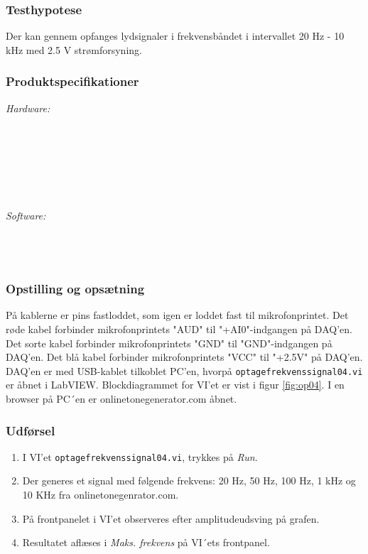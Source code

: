 		\subsubsection{Testhypotese}
		Der kan gennem \elektretto{} opfanges lydsignaler i frekvensbåndet i intervallet 20 Hz - 10 kHz med 2.5 V strømforsyning.
		
		\subsubsection{Produktspecifikationer}
	
			\textit{Hardware:}\\
			\elektretto\\
			\pinstre\\
			\mikrofonkabel\\
			\krympeflex\\
			\daq\\
			\daqusb\\			
			\PC
	
			\textit{Software:}\\
			\labview\\
			\daqsoft\\
			\onlineg\\

	
		\subsubsection{Opstilling og opsætning}
		På kablerne er pins fastloddet, som igen er loddet fast til mikrofonprintet. Det røde kabel forbinder mikrofonprintets "AUD"{} til "+AI0"{}-indgangen på DAQ'en. Det sorte kabel forbinder mikrofonprintets "GND"{} til "GND"{}-indgangen på DAQ'en. Det blå kabel forbinder mikrofonprintets "VCC"{} til "+2.5V"{} på DAQ'en. DAQ'en er med USB-kablet tilkoblet PC'en, hvorpå \texttt{optagefrekvenssignal04.vi} er åbnet i LabVIEW. Blockdiagrammet for VI'et er vist i figur \ref{fig:op04}. I en browser på PC´en er onlinetonegenerator.com åbnet.      
	
		\subsubsection{Udførsel}
			\begin{enumerate}
				\item I VI'et \texttt{optagefrekvenssignal04.vi}, trykkes på \textit{Run}.  
				\item Der generes et signal med følgende frekvens: 20 Hz, 50 Hz, 100 Hz, 1 kHz og 10 KHz fra onlinetonegenrator.com.
				\item På frontpanelet i VI'et observeres efter amplitudeudsving på grafen.   
				\item Resultatet aflæses i \textit{Maks. frekvens} på VI´ets frontpanel.
			\end{enumerate}
			
